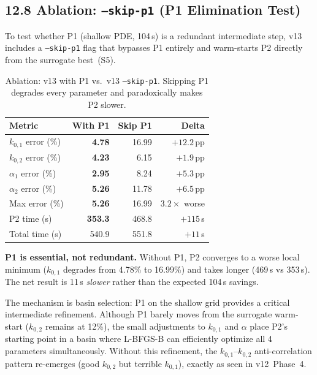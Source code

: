 \documentclass[11pt]{article}
\begin{document}
\subsection*{12.8 Ablation: \texttt{--skip-p1} (P1 Elimination Test)}

To test whether P1 (shallow PDE, 104\,s) is a redundant intermediate step,
v13 includes a \texttt{--skip-p1} flag that bypasses P1 entirely and
warm-starts P2 directly from the surrogate best~(S5).

\begin{table}[H]
  \centering
  \caption{Ablation: v13 with P1 vs.\ v13 \texttt{--skip-p1}.  Skipping P1
           degrades every parameter and paradoxically makes P2 slower.}
  \label{tab:v13_ablation}
  \begin{tabular}{l r r r}
    \toprule
    \textbf{Metric} & \textbf{With P1} & \textbf{Skip P1} & \textbf{Delta} \\
    \midrule
    $k_{0,1}$ error (\%)  & \textbf{4.78}  & 16.99 & $+12.2$\,pp \\
    $k_{0,2}$ error (\%)  & \textbf{4.23}  & 6.15  & $+1.9$\,pp \\
    $\alpha_1$ error (\%) & \textbf{2.95}  & 8.24  & $+5.3$\,pp \\
    $\alpha_2$ error (\%) & \textbf{5.26}  & 11.78 & $+6.5$\,pp \\
    \midrule
    Max error (\%)        & \textbf{5.26}  & 16.99 & $3.2\times$ worse \\
    P2 time (s)           & \textbf{353.3} & 468.8 & $+115$\,s \\
    Total time (s)        & 540.9          & 551.8 & $+11$\,s \\
    \bottomrule
  \end{tabular}
\end{table}

\textbf{P1 is essential, not redundant.}  Without P1, P2 converges to a
worse local minimum ($k_{0,1}$ degrades from 4.78\% to 16.99\%) and
takes longer (469\,s vs 353\,s).  The net result is 11\,s \textit{slower}
rather than the expected 104\,s savings.

The mechanism is basin selection: P1 on the shallow grid provides a critical
intermediate refinement.  Although P1 barely moves from the surrogate warm-start
($k_{0,2}$ remains at 12\%), the small adjustments to $k_{0,1}$ and $\alpha$
place P2's starting point in a basin where L-BFGS-B can efficiently optimize
all 4 parameters simultaneously.  Without this refinement, the
$k_{0,1}$--$k_{0,2}$ anti-correlation pattern re-emerges (good $k_{0,2}$ but
terrible $k_{0,1}$), exactly as seen in v12~Phase~4.
\end{document}
